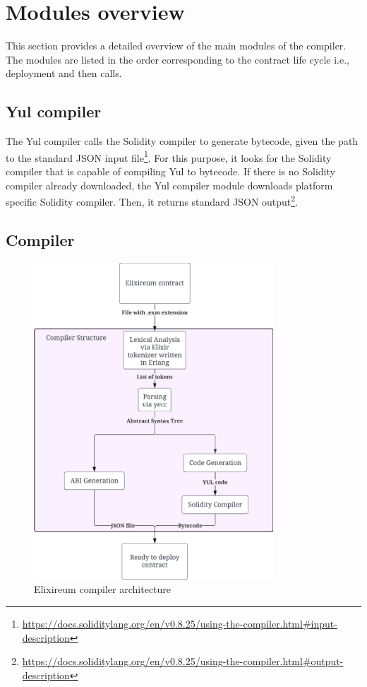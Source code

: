 \section{Modules overview}
This section provides a detailed overview of the main modules of the compiler. The modules are listed in the order corresponding to the contract life cycle i.e., deployment and then calls.
\subsection{Yul compiler}
The Yul compiler calls the Solidity compiler to generate bytecode, given the path to the standard JSON input file\footnote{\url{https://docs.soliditylang.org/en/v0.8.25/using-the-compiler.html\#input-description}}. For this purpose, it looks for the Solidity compiler that is capable of compiling Yul to bytecode. If there is no Solidity compiler already downloaded, the Yul compiler module downloads platform specific Solidity compiler. Then, it returns standard JSON output\footnote{\url{https://docs.soliditylang.org/en/v0.8.25/using-the-compiler.html\#output-description}}.
\subsection{Compiler}
\label{ssec:compiler}


\begin{figure}[H]
  \centering
  \includegraphics[width=0.8\textwidth]{figs/arch.png}
  \caption{Elixireum compiler architecture}
  \label{fig:arch}
\end{figure}

